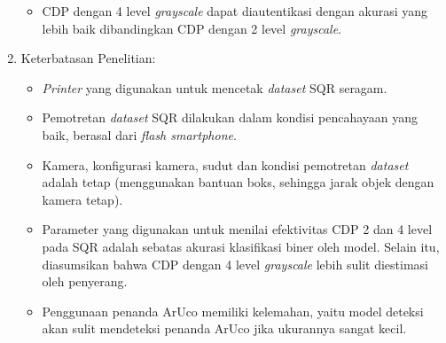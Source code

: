 \begin{enumerate}
\begin{itemize}
                  \item CDP dengan 4 level \emph{grayscale} dapat diautentikasi dengan akurasi yang lebih baik dibandingkan CDP dengan 2 level \emph{grayscale}.
            \end{itemize}
      \item Keterbatasan Penelitian:
            \begin{itemize}
                  \item \emph{Printer} yang digunakan untuk mencetak \emph{dataset} SQR seragam.
                  \item Pemotretan \emph{dataset} SQR dilakukan dalam kondisi pencahayaan yang baik, berasal dari \emph{flash smartphone}.
                  \item Kamera, konfigurasi kamera, sudut dan kondisi pemotretan \emph{dataset} adalah tetap (menggunakan bantuan boks, sehingga jarak objek dengan kamera tetap).
                  \item Parameter yang digunakan untuk menilai efektivitas CDP 2 dan 4 level pada SQR adalah sebatas akurasi klasifikasi biner oleh model. Selain itu, diasumsikan
                        bahwa CDP dengan 4 level \emph{grayscale} lebih sulit diestimasi oleh penyerang.
                  \item Penggunaan penanda ArUco memiliki kelemahan, yaitu model deteksi akan sulit mendeteksi penanda ArUco jika ukurannya sangat kecil.
            \end{itemize}
\end{enumerate}

